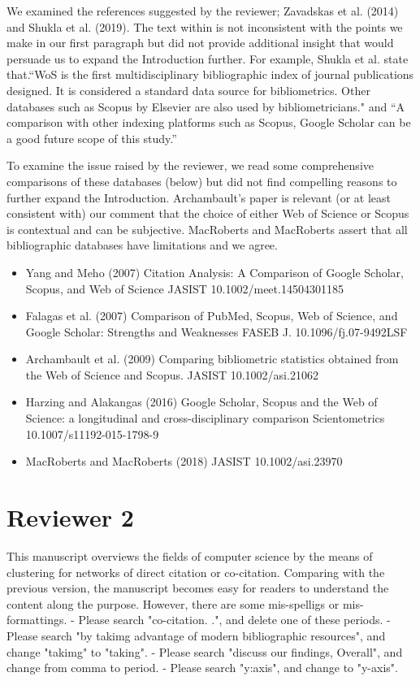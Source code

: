 \documentclass[11pt, oneside]{article}   	%
\begin{document}
\begin{enumerate}
We examined the references suggested by the reviewer; Zavadskas et al. (2014) and Shukla et al. (2019). The text within is not inconsistent with the points we make in our first paragraph but did not 
provide additional insight that would persuade us to expand the Introduction further. For example, Shukla et al. state that.``WoS is the first multidisciplinary bibliographic index of journal publications designed. 
It is considered a standard data source for bibliometrics. Other databases such as Scopus by Elsevier are also used by bibliometricians." and ``A comparison with other indexing platforms such as Scopus, 
Google Scholar can be a good future scope of this study.''

To examine the issue raised by the reviewer, we read some comprehensive comparisons of these databases (below) but did not find compelling reasons to further expand the Introduction. Archambault's 
paper is relevant (or at least consistent with) our comment that the choice of either Web of Science or Scopus is contextual and can be subjective. 
MacRoberts and MacRoberts assert that all bibliographic databases have limitations and we agree. 

\begin{itemize}
\item Yang and Meho (2007) Citation Analysis: A Comparison of Google Scholar, Scopus, and Web of Science JASIST 10.1002/meet.14504301185
\item Falagas et al. (2007) Comparison of PubMed, Scopus, Web of Science, and Google Scholar: Strengths and Weaknesses FASEB J. 10.1096/fj.07-9492LSF
\item Archambault et al. (2009)  Comparing bibliometric statistics obtained from the Web of Science and Scopus. JASIST  10.1002/asi.21062
\item Harzing and Alakangas (2016) Google Scholar, Scopus and the Web of Science: a longitudinal and cross-disciplinary comparison Scientometrics 10.1007/s11192-015-1798-9
\item MacRoberts and MacRoberts (2018) JASIST 10.1002/asi.23970
\end{itemize}
\end{enumerate}


\section*{Reviewer 2} 

This manuscript overviews the fields of computer science by the means of clustering for networks of direct citation or co-citation. Comparing with the previous version, the manuscript 
becomes easy for readers to understand the content along the purpose. However, there are some mis-spelligs or mis-formattings.
- Please search "co-citation. .", and delete one of these periods.
- Please search "by takimg advantage of modern bibliographic resources", and change "takimg" to "taking".
- Please search "discuss our findings, Overall", and change from comma to period.
- Please search "y:axis", and change to "y-axis".
\end{document}

